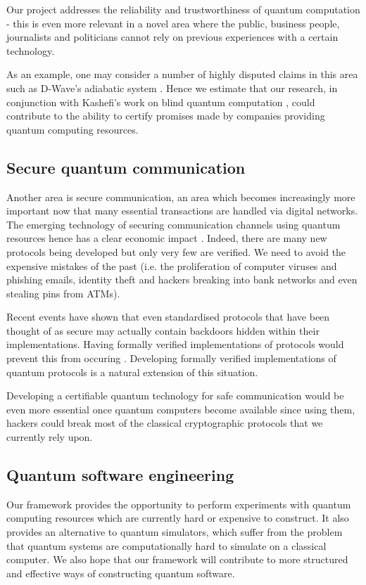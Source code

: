 \documentclass[a4paper]{article}
\begin{document}
Our project addresses the reliability and
trustworthiness of quantum computation - this is even more relevant in
a novel area where the public, business people, journalists and
politicians cannot rely on previous experiences with a certain
technology. 

As an example, one may consider a number of highly
disputed claims in this area such as D-Wave's adiabatic system
\cite{dwave,Warren2013}. Hence we estimate that our research, in conjunction with
Kashefi's work on blind quantum computation \cite{blind,blind2}, 
could contribute to the ability to certify promises made by companies
providing quantum computing resources.


\subsection*{Secure quantum communication}
\label{sec:secure-quant-comm}

Another area is secure communication, an area which becomes
increasingly more important now that many essential transactions are
handled via digital networks. The emerging technology of securing
communication channels using quantum resources hence has a clear
economic impact \cite{qci}. Indeed, there are many
new protocols being developed but only very few are verified. We need
to avoid the expensive mistakes of the past (i.e. the proliferation of
computer viruses and phishing emails, identity theft and hackers
breaking into bank networks and even stealing pins from ATMs).

Recent events have shown that even standardised protocols that have
been thought of as secure may actually contain backdoors hidden within
their implementations. Having formally verified implementations of
protocols would prevent this from occuring
\cite{hales2013}. Developing formally verified implementations of
quantum protocols is a natural extension of this situation.

Developing a certifiable quantum technology for safe communication
would be even more essential once quantum computers become available
since using them, hackers could break most of the classical
cryptographic protocols that we currently rely upon.

\subsection*{Quantum software engineering}
\label{sec:quant-softw-engin}

Our framework provides the opportunity to perform experiments with
quantum computing resources which are currently hard or expensive to
construct. It also provides an alternative to quantum simulators, which
suffer from the problem that quantum systems are computationally hard
to simulate on a classical computer. We also hope that our framework
will contribute to more structured and effective ways of constructing
quantum software. 
\end{document}
